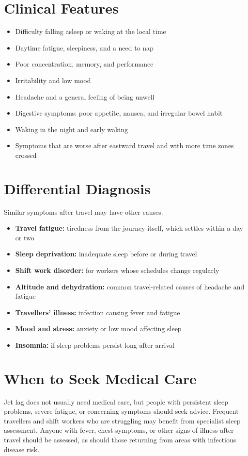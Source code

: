 \section*{Clinical Features}
\begin{itemize}
    \item Difficulty falling asleep or waking at the local time
    \item Daytime fatigue, sleepiness, and a need to nap
    \item Poor concentration, memory, and performance
    \item Irritability and low mood
    \item Headache and a general feeling of being unwell
    \item Digestive symptoms: poor appetite, nausea, and irregular bowel habit
    \item Waking in the night and early waking
    \item Symptoms that are worse after eastward travel and with more time zones crossed
\end{itemize}

\section*{Differential Diagnosis}
Similar symptoms after travel may have other causes.
\begin{itemize}
    \item \textbf{Travel fatigue:} tiredness from the journey itself, which settles within a day or two
    \item \textbf{Sleep deprivation:} inadequate sleep before or during travel
    \item \textbf{Shift work disorder:} for workers whose schedules change regularly
    \item \textbf{Altitude and dehydration:} common travel-related causes of headache and fatigue
    \item \textbf{Travellers' illness:} infection causing fever and fatigue
    \item \textbf{Mood and stress:} anxiety or low mood affecting sleep
    \item \textbf{Insomnia:} if sleep problems persist long after arrival
\end{itemize}

\section*{When to Seek Medical Care}
Jet lag does not usually need medical care, but people with persistent sleep problems, severe fatigue, or concerning symptoms should seek advice. Frequent travellers and shift workers who are struggling may benefit from specialist sleep assessment. Anyone with fever, chest symptoms, or other signs of illness after travel should be assessed, as should those returning from areas with infectious disease risk.

